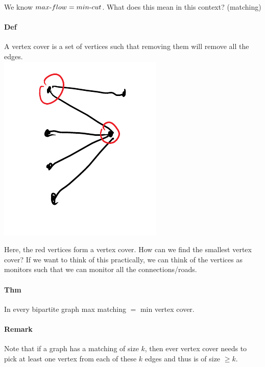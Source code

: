 \documentclass[12 pt]{article}
\begin{document}
        We know $max\hbox{-}flow=min\hbox{-}cut$. What does this mean
        in this context? (matching)
        \paragraph{Def}A vertex cover is a set of vertices such that
        removing them will remove all the edges.
        \\ \includegraphics[width=.7\textwidth]{i55.pdf}

        Here, the red vertices form a vertex cover. How can we find
        the smallest vertex cover? If we want to think of this
        practically, we can think of the vertices as monitors such
        that we can monitor all the connections/roads.
        \paragraph{Thm} In every bipartite graph max matching $=$ min
        vertex cover.

        \paragraph{Remark} Note that if a graph has a matching of size
        $k$, then ever vertex cover needs to pick at least one vertex
        from each of these $k$ edges and thus is of size $\geq k$.
\end{document}
